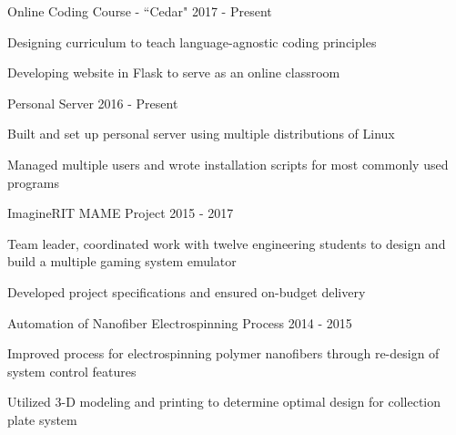 \begin{cventries}
	\cvproject
	{Online Coding Course - ``Cedar"}
	{2017 - Present}
	{
		\begin{cvitems}
		\item {Designing curriculum to teach language-agnostic coding principles}
		\item {Developing website in Flask to serve as an online classroom}
		\end{cvitems}
	}

  \cvproject
	{Personal Server}
	{2016 - Present}
    {
      \begin{cvitems}
        \item {Built and set up personal server using multiple distributions of Linux}
		\item {Managed multiple users and wrote installation scripts for most commonly used programs}
      \end{cvitems}
    }

	\cvproject
	{ImagineRIT MAME Project}
	{2015 - 2017}
	{
		\begin{cvitems}
		\item{Team leader, coordinated work with twelve engineering students to design and build a multiple gaming system emulator}
		\item{Developed project specifications and ensured on-budget delivery}
		\end{cvitems}
	}

	\cvproject
	{Automation of Nanofiber Electrospinning Process}
	{2014 - 2015}
	{
		\begin{cvitems}
		\item {Improved process for electrospinning polymer nanofibers through re-design of system control features}
		\item {Utilized 3-D modeling and printing to determine optimal design for collection plate system}
		\end{cvitems}
	}
\end{cventries}
